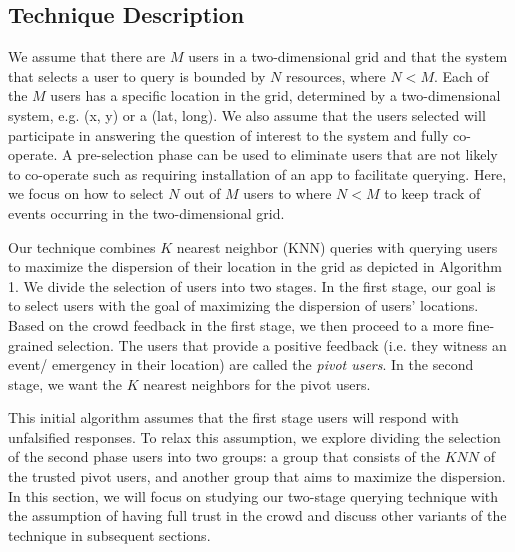 \documentclass{acm_proc_article-sp}
\begin{document}
\subsection{Technique Description}
We assume that there are $M$ users in a two-dimensional grid and that the system that selects a user to query is bounded by $N$ resources, where $N < M$.  Each of the $M$ users has a specific location in the grid, determined by a two-dimensional system, e.g. (x, y) or a (lat, long). We also assume that the users selected will participate in answering the question of interest to the system and fully co-operate. A pre-selection phase can be used to eliminate users that are not likely to co-operate such as requiring installation of an app to facilitate querying. Here, we focus on how to select $N$ out of $M$ users to  where $N < M$ to keep track of events occurring in the two-dimensional grid.\par
Our technique combines $K$ nearest neighbor (KNN) queries with querying users to maximize the dispersion of their location in the grid as depicted in Algorithm 1. We divide the selection of users into two stages. In the first stage, our goal is to select users with the goal of maximizing the dispersion of users' locations. Based on the crowd feedback in the first stage, we then proceed to a more fine-grained selection. The users that provide a positive feedback (i.e. they witness an event/ emergency in their location) are called the \textit{pivot users}. In the second stage, we want the $K$ nearest neighbors for the pivot users. \par
This initial algorithm assumes that the first stage users will respond with unfalsified responses. To relax this assumption, we explore dividing the selection of the second phase users into two groups: a group that consists of the $KNN$ of the trusted pivot users, and another group that aims to maximize the dispersion. In this section, we will focus on studying our two-stage querying technique with the assumption of having full trust in the crowd and discuss other variants of the technique in subsequent sections.\par
\end{document}
